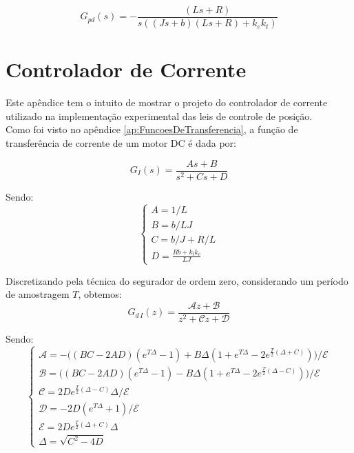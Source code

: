 \documentclass[]{politex}
\begin{document}
    \begin{equation}
    \label{FunctionMotord}
     G_{pd}(s) = - \frac{(L s + R)}{s((J s + b)(L s + R) + k_{e} k_{t})}
    \end{equation}


\chapter{Controlador de Corrente} \label{ap:ControladorDeCorrente}

Este apêndice tem o intuito de mostrar o projeto do controlador de corrente utilizado na implementação experimental das leis de controle de posição. \\

Como foi visto no apêndice \ref{ap:FuncoesDeTransferencia}, a função de transferência de corrente de um motor DC é dada por:

\begin{equation} \label{functionTransferMotorCorrente}
G_{I}(s) = \frac{A s+B}{s^2 + C s + D}
\end{equation}

Sendo:
\begin{equation}
\begin{cases}
A = 1/L \\
B = b/LJ \\
C = b/J + R/L \\
D = \frac{Rb + k_t k_e}{LJ}
\end{cases}
\end{equation}

Discretizando pela técnica do segurador de ordem zero, considerando um período de amostragem $T$, obtemos:
\begin{equation}
G_{d\,I}(z) = \frac{\mathcal{A} z + \mathcal{B}}{z^2 + \mathcal{C} z + \mathcal{D}}
\end{equation}

Sendo:
\begin{equation}
\begin{cases}
\mathcal{A} = -  \Big( (BC - 2AD)(e^{T \Delta} -1) + B \Delta (1 + e^{T \Delta} - 2 e^{\frac{T}{2}(\Delta+C)} ) \Big) / \mathcal{E}\\
\mathcal{B} =   \Big( (BC - 2AD)(e^{T \Delta} -1) - B \Delta (1 + e^{T \Delta} - 2 e^{\frac{T}{2}(\Delta-C)} ) \Big) / \mathcal{E} \\
\mathcal{C} = 2 D  e^{\frac{T}{2}  (\Delta - C )} \Delta / \mathcal{E} \\
\mathcal{D} = -2 D  \left(e^{T \Delta}+1\right) / \mathcal{E} \\
\mathcal{E} = 2 D  e^{\frac{T}{2}(\Delta + C)} \Delta \\
\Delta = \sqrt{C^2 - 4D}
\end{cases}
\end{equation}
\end{document}
